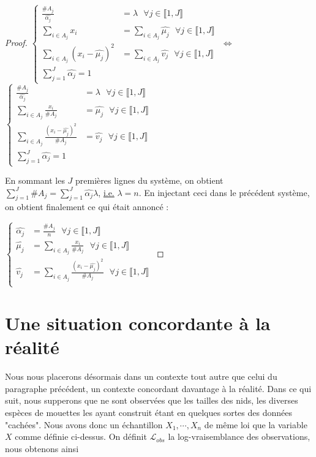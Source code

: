 \documentclass[frenchb]{report}
\newcommand{\1}{\mathbbm{1}}
\theoremstyle{definition}\newtheorem{defn}{Définition}
\theoremstyle{definition}\newtheorem{exm}{Exemple}
\theoremstyle{definition}\newtheorem{nota}{Notation}
\theoremstyle{definition}\newtheorem{rem}{Remarque}
\begin{document}
\begin{proof}
$
\begin{cases}
\displaystyle\frac{\#A_j}{\hat{\alpha_j}} &= \lambda \text{ } \forall j \in \llbracket 1,J \rrbracket \\
\displaystyle\sum_{i\in A_j}x_i & =\displaystyle\sum_{i\in A_j} \hat{\mu_j} \text{ } \forall j \in \llbracket 1,J \rrbracket \\
\displaystyle\sum_{i\in A_j} (x_i-\hat{\mu_j})^2 &= \displaystyle\sum_{i\in A_j} \hat{v_j}  \text{ } \forall j \in \llbracket 1,J \rrbracket \\
\displaystyle\sum_{j=1}^J \hat{\alpha_j} = 1
\end{cases}
$
$\Leftrightarrow$
$
\begin{cases}
\displaystyle\frac{\#A_j}{\hat{\alpha_j}} &= \lambda \text{ } \forall j \in \llbracket 1,J \rrbracket \\
\displaystyle\sum_{i\in A_j}\frac{x_i}{\#A_j} & = \hat{\mu_j} \text{ } \forall j \in \llbracket 1,J \rrbracket \\
\displaystyle\sum_{i\in A_j} \frac{(x_i-\hat{\mu_j})^2}{\#A_j} &=  \hat{v_j}  \text{ } \forall j \in \llbracket 1,J \rrbracket \\
\displaystyle\sum_{j=1}^J \hat{\alpha_j} = 1
\end{cases}
$

En sommant les $J$ premières lignes du système, on obtient $\displaystyle\sum_{j=1}^J\#A_j = \sum_{j=1}^J\hat{\alpha_j}\lambda$, \underline{i.e.} $\lambda = n$. En injectant ceci dans le précédent système, on obtient finalement ce qui était annoncé :

$
\begin{cases}
\hat{\alpha_j} &= \displaystyle \frac{\#A_j}{n} \text{ } \forall j \in \llbracket 1,J \rrbracket \\
\hat{\mu_j} &= \displaystyle\sum_{i\in A_j}\frac{x_i}{\#A_j} \text{ } \forall j \in \llbracket 1,J \rrbracket \\
\hat{v_j} &= \displaystyle\sum_{i\in A_j} \frac{(x_i-\hat{\mu_j})^2}{\#A_j}  \text{ } \forall j \in \llbracket 1,J \rrbracket \\
\end{cases}
$
\end{proof}


\section{Une situation concordante à la réalité} %
Nous nous placerons désormais dans un contexte tout autre que celui du paragraphe précédent, un contexte concordant davantage à la réalité. Dans ce qui suit, nous supperons que ne sont observées que les tailles des nids, les diverses espèces de mouettes les ayant construit étant en quelques sortes des données "cachées". Nous avons donc un échantillon $X_1,\cdots, X_n$ de même loi que la variable $X$ comme définie ci-dessus. \newline
On définit $\mathcal{L}_{obs}$ la log-vraisemblance des observations, nous obtenons ainsi 
\end{document}

